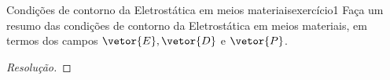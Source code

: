 \begin{exercício}{Condições de contorno da Eletrostática em meios materiais}{exercício1}
    Faça um resumo das condições de contorno da Eletrostática em meios materiais, em termos dos campos \(\vetor{E}, \vetor{D}\) e \(\vetor{P}\).
\end{exercício}
\begin{proof}[Resolução]

\end{proof}
